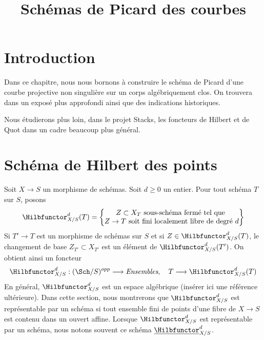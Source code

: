 

%


\title{Schémas de Picard des courbes}


\maketitle

\label{section-phantom}

\tableofcontents


\section{Introduction}
\label{section-introduction}

\noindent
Dans ce chapitre, nous nous bornons à construire le schéma de Picard
d'une courbe projective non singulière sur un corps algébriquement clos.
On trouvera dans \cite{Kleiman-Picard} un exposé plus approfondi ainsi que
des indications historiques.

\medskip\noindent
Nous étudierons plus loin, dans le projet Stacks, les foncteurs de Hilbert et de Quot
dans un cadre beaucoup plus général.


\section{Schéma de Hilbert des points}
\label{section-hilbert-scheme-points}

\noindent
Soit $X \to S$ un morphisme de schémas. Soit $d \geq 0$ un entier.
Pour tout schéma $T$ sur $S$, posons
$$
\Hilbfunctor^d_{X/S}(T) =
\left\{
\begin{matrix}
Z \subset X_T\text{ sous-schéma fermé tel que }\\
Z \to T\text{ soit fini localement libre de degré }d
\end{matrix}
\right\}
$$
Si $T' \to T$ est un morphisme de schémas sur $S$ et si
$Z \in \Hilbfunctor^d_{X/S}(T)$, le changement de base
$Z_{T'} \subset X_{T'}$ est un élément de $\Hilbfunctor^d_{X/S}(T')$.
On obtient ainsi un foncteur
$$
\Hilbfunctor^d_{X/S} :
(\Sch/S)^{opp} \longrightarrow \textit{Ensembles},\quad
T \longrightarrow \Hilbfunctor^d_{X/S}(T)
$$
En général, $\Hilbfunctor^d_{X/S}$ est un espace algébrique
(insérer ici une référence ultérieure). Dans cette section, nous
montrerons que $\Hilbfunctor^d_{X/S}$ est représentable
par un schéma si tout ensemble fini de points d'une fibre de
$X \to S$ est contenu dans un ouvert affine.
Lorsque $\Hilbfunctor^d_{X/S}$ est représentable par un schéma, nous
notons souvent ce schéma $\underline{\Hilbfunctor}^d_{X/S}$.


